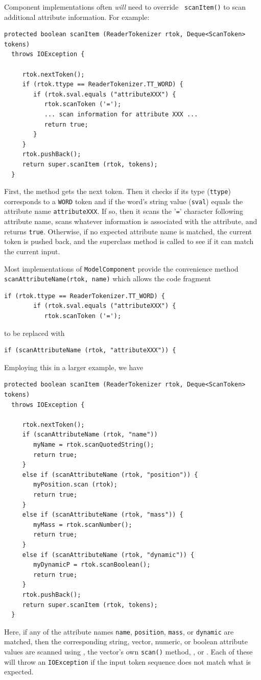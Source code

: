\documentclass{article}
\begin{document}
Component implementations often {\it will} need to override {\tt
scanItem()} to scan additional attribute information. For example:
\begin{lstlisting}[]
  protected boolean scanItem (ReaderTokenizer rtok, Deque<ScanToken> tokens)
  throws IOException {

     rtok.nextToken();
     if (rtok.ttype == ReaderTokenizer.TT_WORD) {
        if (rtok.sval.equals ("attributeXXX") {
           rtok.scanToken ('=');
           ... scan information for attribute XXX ...
           return true;
        }
     }
     rtok.pushBack();
     return super.scanItem (rtok, tokens);
  }     
\end{lstlisting}
First, the method gets the next token. Then it checks if its type
({\tt ttype}) corresponds to a {\tt WORD} token and if the word's string
value ({\tt sval}) equals the attribute name {\tt attributeXXX}.  If
so, then it scans the '{\tt =}' character following attribute name,
scans whatever information is associated with the attribute, and
returns {\tt true}.  Otherwise, if no expected attribute name is
matched, the current token is pushed back, and the superclass method
is called to see if it can match the current input.

Most implementations of {\tt ModelComponent}
provide the convenience method {\tt scanAttributeName(rtok, name)}
which allows the code fragment 
\begin{lstlisting}[]
     if (rtok.ttype == ReaderTokenizer.TT_WORD) {        
        if (rtok.sval.equals ("attributeXXX") {
           rtok.scanToken ('=');
\end{lstlisting}
to be replaced with
\begin{lstlisting}[]
      if (scanAttributeName (rtok, "attributeXXX")) {
\end{lstlisting}
Employing this in a larger example, we have
\begin{lstlisting}[]
  protected boolean scanItem (ReaderTokenizer rtok, Deque<ScanToken> tokens)
  throws IOException {

     rtok.nextToken();
     if (scanAttributeName (rtok, "name")) 
        myName = rtok.scanQuotedString();
        return true;
     }
     else if (scanAttributeName (rtok, "position")) {
        myPosition.scan (rtok);
        return true;
     }
     else if (scanAttributeName (rtok, "mass")) {
        myMass = rtok.scanNumber();
        return true;
     }
     else if (scanAttributeName (rtok, "dynamic")) {
        myDynamicP = rtok.scanBoolean();
        return true;
     }
     rtok.pushBack();
     return super.scanItem (rtok, tokens);
  }     
\end{lstlisting}
Here, if any of the attribute names 
{\tt name}, {\tt position}, {\tt mass}, or {\tt dynamic} are matched,
then the 
corresponding string, vector, numeric, or boolean attribute values are
scanned using
, the
vector's own {\tt scan()} method,
, or
.  Each of
these will throw an {\tt IOException} if the input token sequence does
not match what is expected.
\end{document}
